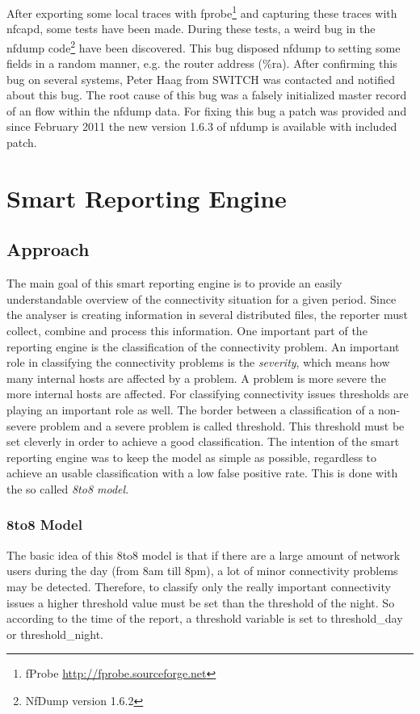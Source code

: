 After exporting some local traces with fprobe\footnote{fProbe \url{http://fprobe.sourceforge.net}} and capturing these traces with nfcapd, some tests have been made. During these tests, a weird bug in the nfdump code\footnote{NfDump version 1.6.2} have been discovered. This bug disposed nfdump to setting some fields in a random manner, e.g. the router address (\%ra). After confirming this bug on several systems, Peter Haag from SWITCH was contacted and notified about this bug. The root cause of this bug was a falsely initialized master record of an flow within the nfdump data. For fixing this bug a patch was provided and since February 2011 the new version 1.6.3 of nfdump is available with included patch.


\section{Smart Reporting Engine}

\subsection{Approach}
The main goal of this smart reporting engine is to provide an easily understandable overview of the connectivity situation for a given period. Since the analyser is creating information in several distributed files, the reporter must collect, combine and process this information. One important part of the reporting engine is the classification of the connectivity problem. An important role in classifying the connectivity problems is the \emph{severity}, which means how many internal hosts are affected by a problem. A problem is more severe the more internal hosts are affected. For classifying connectivity issues thresholds are playing an important role as well. The border between a classification of a non-severe problem and a severe problem is called threshold. This threshold must be set cleverly in order to achieve a good classification. The intention of the smart reporting engine was to keep the model as simple as possible, regardless to achieve an usable classification with a low false positive rate. This is done with the so called \emph{8to8 model}.

\subsubsection{8to8 Model}
The basic idea of this 8to8 model is that if there are a large amount of network users during the day (from 8am till 8pm), a lot of minor connectivity problems may be detected. Therefore, to classify only the really important connectivity issues a higher threshold value must be set than the threshold of the night. So according to the time of the report, a threshold variable is set to threshold\_day or threshold\_night.

